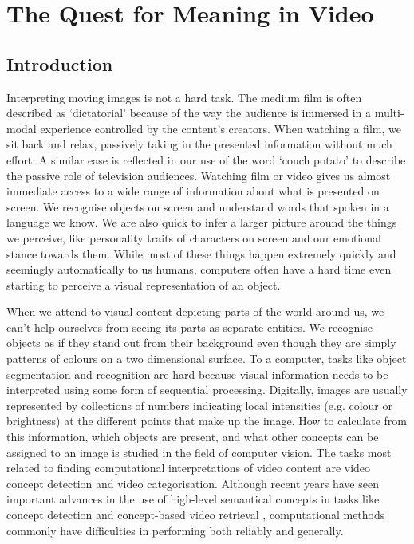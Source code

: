 \chapter{The Quest for Meaning in Video}
\label{ch:quest}

\section{Introduction} %
\label{sec:introduction}

Interpreting moving images is not a hard task. The medium film is often described as `dictatorial' because of the way the audience is immersed in a multi-modal experience controlled by the content's creators. When watching a film, we sit back and relax, passively taking in the presented information without much effort. A similar ease is reflected in our use of the word `couch potato' to describe the passive role of television audiences. Watching film or video gives us almost immediate access to a wide range of information about what is presented on screen. We recognise objects on screen and understand words that spoken in a language we know. We are also quick to infer a larger picture around the things we perceive, like personality traits of characters on screen and our emotional stance towards them. While most of these things happen extremely quickly and seemingly automatically to us humans, computers often have a hard time even starting to perceive a visual representation of an object.

When we attend to visual content depicting parts of the world around us, we can't help ourselves from seeing its parts as separate entities. We recognise objects as if they stand out from their background even though they are simply patterns of colours on a two dimensional surface. To a computer, tasks like object segmentation and recognition are hard because visual information needs to be interpreted using some form of sequential processing. Digitally, images are usually represented by collections of numbers indicating local intensities (e.g. colour or brightness) at the different points that make up the image. How to calculate from this information, which objects are present, and what other concepts can be assigned to an image is studied in the field of computer vision. The tasks most related to finding computational interpretations of video content are video concept detection and video categorisation. Although recent years have seen important advances in the use of high-level semantical concepts in tasks like concept detection and concept-based video retrieval \cite{Snoek:2009dq, Snoek:jf, Worring:2007vm, Chang:2008wh}, computational methods commonly have difficulties in performing both reliably and generally\cite{Urban:2006up, Snoek:2009dq}.

